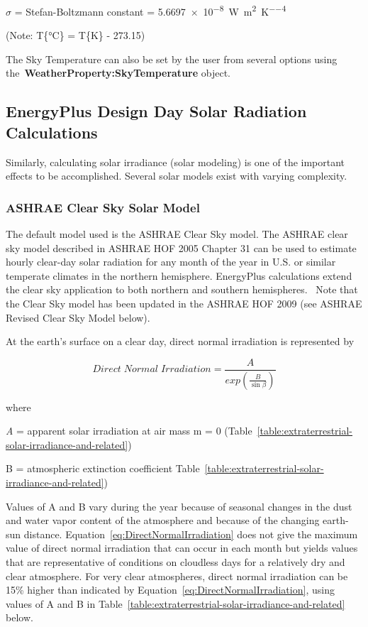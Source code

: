 $\sigma$ = Stefan-Boltzmann constant = \SI{5.6697e-8}{\watt\per\meter\squared\per\kelvin\tothe{4}}
\newline

(Note: T\{\si{\celsius}\} = T\{\si{\kelvin}\} - 273.15)
\newline

The Sky Temperature can also be set by the user from several options using the~\textbf{WeatherProperty:SkyTemperature} object.

\subsection{EnergyPlus Design Day Solar Radiation Calculations}\label{energyplus-design-day-solar-radiation-calculations}

Similarly, calculating solar irradiance (solar modeling) is one of the important effects to be accomplished. Several solar models exist with varying complexity.

\subsubsection{ASHRAE Clear Sky Solar Model}\label{ashrae-clear-sky-solar-model}

The default model used is the ASHRAE Clear Sky model. The ASHRAE clear sky model described in ASHRAE HOF 2005 Chapter 31 can be used to estimate hourly clear-day solar radiation for any month of the year in U.S. or similar temperate climates in the northern hemisphere. EnergyPlus calculations extend the clear sky application to both northern and southern hemispheres.~ Note that the Clear Sky model has been updated in the ASHRAE HOF 2009 (see ASHRAE Revised Clear Sky Model below).

At the earth's surface on a clear day, direct normal irradiation is represented by

\begin{equation}
Direct\;Normal\;Irradiation = \frac{A}{exp\left( \frac{B}{\sin \beta } \right)}
\label{eq:DirectNormalIrradiation}
\end{equation}

where

\emph{A} = apparent solar irradiation at air mass m = 0 (Table~\ref{table:extraterrestrial-solar-irradiance-and-related})

B = atmospheric extinction coefficient Table~\ref{table:extraterrestrial-solar-irradiance-and-related})

Values of A and B vary during the year because of seasonal changes in the dust and water vapor content of the atmosphere and because of the changing earth-sun distance. Equation~\ref{eq:DirectNormalIrradiation} does not give the maximum value of direct normal irradiation that can occur in each month but yields values that are representative of conditions on cloudless days for a relatively dry and clear atmosphere. For very clear atmospheres, direct normal irradiation can be 15\% higher than indicated by Equation~\ref{eq:DirectNormalIrradiation}, using values of A and B in Table~\ref{table:extraterrestrial-solar-irradiance-and-related} below.

